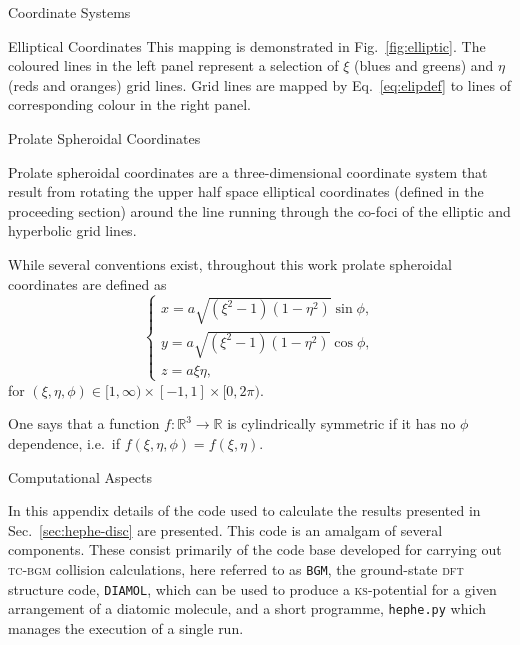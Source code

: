 \documentclass[letterpaper, 11 pt]{report}
\begin{document}
\begin{appendices}
\begin{chapter}{Coordinate Systems \label{chap:coords}}
\begin{section}{Elliptical Coordinates \label{sec:elliptic}}
         This mapping is demonstrated in Fig.~\ref{fig:elliptic}. The coloured lines in the left panel
         represent a selection of $\xi$ (blues and greens) and $\eta$ (reds and oranges) grid lines.
         Grid lines are mapped by Eq.~\eqref{eq:elipdef} to lines of corresponding colour in the right
         panel.

      \end{section}

      \begin{section}{Prolate Spheroidal Coordinates \label{sec:prolate}}

         Prolate spheroidal coordinates are a three-dimensional coordinate system that result from
         rotating the upper half space elliptical coordinates (defined in the proceeding section) around
         the line running through the co-foci of the elliptic and hyperbolic grid lines.

         While several conventions exist, throughout this work prolate spheroidal coordinates are
         defined as
         \begin{equation} \label{eq:psc}
            \left\{
            \begin{array}{l}
               x = a \sqrt{(\xi^2 - 1)(1 - \eta^2)} \sin \phi, \\
               y = a \sqrt{(\xi^2 - 1)(1 - \eta^2)} \cos \phi, \\
               z = a \xi \eta,
            \end{array}
            \right.
         \end{equation}
         for $(\xi, \eta, \phi) \in [1, \infty) \times [-1,1] \times [0,2\pi)$.

         One says that a function $f: \mathbb{R}^3 \rightarrow \mathbb{R}$ is cylindrically symmetric if
         it has no $\phi$ dependence, i.e.\ if $f(\xi,\eta,\phi) = f(\xi,\eta)$.

      \end{section}

   \end{chapter}

   \begin{chapter}{Computational Aspects \label{chap:calcdeets}}

      In this appendix details of the code used to calculate the results presented in
      Sec.~\ref{sec:hephe-disc} are presented. This code is an amalgam of several components. These
      consist primarily of the code base developed for carrying out \textsc{tc-bgm} collision
      calculations, here referred to as \texttt{BGM}, the ground-state \textsc{dft} structure code,
      \texttt{DIAMOL}, which can be used to produce a \textsc{ks}-potential for a given arrangement of a
      diatomic molecule, and a short programme, \texttt{hephe.py} which manages the execution of a single
      run.


\end{chapter}
\end{appendices}
\end{document}
